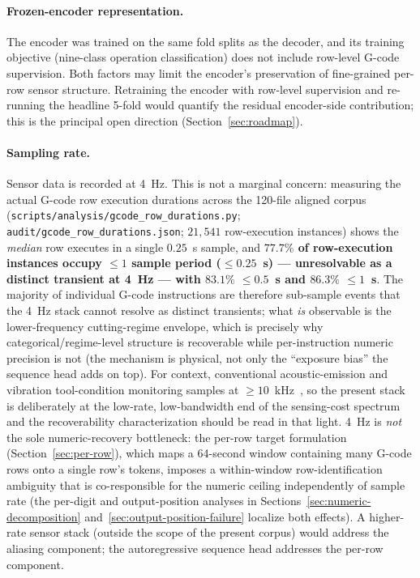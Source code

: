 \documentclass[sensors,article,submit,moreauthors,pdftex]{Definitions/mdpi}
\begin{document}
\paragraph{Frozen-encoder representation.} The encoder was trained on the same fold splits as the decoder, and its training objective (nine-class operation classification) does not include row-level G-code supervision. Both factors may limit the encoder's preservation of fine-grained per-row sensor structure. Retraining the encoder with row-level supervision and re-running the headline 5-fold would quantify the residual encoder-side contribution; this is the principal open direction (Section~\ref{sec:roadmap}).

\paragraph{Sampling rate.} Sensor data is recorded at 4~Hz. This is not a marginal concern: measuring the actual G-code row execution durations across the 120-file aligned corpus (\texttt{scripts/analysis/gcode\_row\_durations.py}; \texttt{audit/gcode\_row\_durations.json}; $21{,}541$ row-execution instances) shows the \emph{median} row executes in a single $0.25$~s sample, and \textbf{$77.7\%$ of row-execution instances occupy $\le\!1$ sample period ($\le\!0.25$~s) --- unresolvable as a distinct transient at 4~Hz --- with $83.1\%$ $\le\!0.5$~s and $86.3\%$ $\le\!1$~s}. The majority of individual G-code instructions are therefore sub-sample events that the 4~Hz stack cannot resolve as distinct transients; what \emph{is} observable is the lower-frequency cutting-regime envelope, which is precisely why categorical/regime-level structure is recoverable while per-instruction numeric precision is not (the mechanism is physical, not only the ``exposure bias'' the sequence head adds on top). For context, conventional acoustic-emission and vibration tool-condition monitoring samples at $\geq\!10$~kHz~\cite{teti2010advanced}, so the present stack is deliberately at the low-rate, low-bandwidth end of the sensing-cost spectrum and the recoverability characterization should be read in that light. 4~Hz is \emph{not} the sole numeric-recovery bottleneck: the per-row target formulation (Section~\ref{sec:per-row}), which maps a 64-second window containing many G-code rows onto a single row's tokens, imposes a within-window row-identification ambiguity that is co-responsible for the numeric ceiling independently of sample rate (the per-digit and output-position analyses in Sections~\ref{sec:numeric-decomposition} and~\ref{sec:output-position-failure} localize both effects). A higher-rate sensor stack (outside the scope of the present corpus) would address the aliasing component; the autoregressive sequence head addresses the per-row component.
\end{document}
